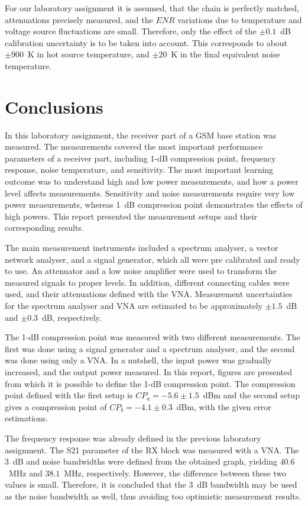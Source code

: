 \documentclass[a4paper, 12pt]{article}
\begin{document}
For our laboratory assignment it is assumed, that the chain is perfectly matched, attenuations 
precisely measured, and the $\mathit{ENR}$ variations due to temperature and voltage source fluctuations 
are small. Therefore, only the effect of the $\pm 0.1$~dB calibration uncertainty is to be 
taken into account. This corresponds to about $\pm900$~K in hot source temperature, and 
$\pm20$~K in the final equivalent noise temperature.

\newpage
\section{Conclusions}

In this laboratory assignment, the receiver part of a GSM base station was measured. The 
measurements covered the most important performance parameters of a receiver part, including 
1-dB compression point, frequency response, noise temperature, and sensitivity. The most 
important learning outcome was to understand high and low power measurements, and how a 
power level affects measurements. Sensitivity and noise measurements require very low power 
measurements, whereas 1~dB compression point demonstrates the effects of high powers. This 
report presented the measurement setups and their corresponding results.

The main measurement instruments included a spectrum analyser, a vector network analyser, and 
a signal generator, which all were pre calibrated and ready to use. An attenuator and a low 
noise amplifier were used to transform the measured signals to proper levels. In addition, 
different connecting cables were used, and their attenuations defined with the VNA. Measurement 
uncertainties for the spectrum analyser and VNA are estimated to be approximately $\pm1.5$~dB 
and $\pm0.3$~dB, respectively.

The 1-dB compression point was measured with two different measurements. The first was done 
using a signal generator and a spectrum analyser, and the second was done using only a VNA. 
In a nutshell, the input power was gradually increased, and the output power measured. In this 
report, figures are presented from which it is possible to define the 1-dB compression point. 
The compression point defined with the first setup is $CP_a = -5.6 \pm 1.5$~dBm and the second 
setup gives a compression point of $CP_b = -4.1 \pm 0.3$~dBm, with the given error estimations.

The frequency response was already defined in the previous laboratory assignment. The S21 
parameter of the RX block was measured with a VNA. The $3$~dB and noise bandwidths were 
defined from the obtained graph, yielding $40.6$~MHz and $38.1$~MHz, respectively. However, 
the difference between these two values is small. Therefore, it is concluded that the $3$~dB 
bandwidth may be used as the noise bandwidth as well, thus avoiding too optimistic measurement 
results.
\end{document}

